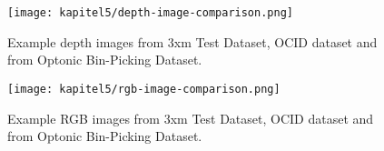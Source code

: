		\FloatBarrier
		\begin{figure}[h]
			\centering
			\texttt{[image: kapitel5/depth-image-comparison.png]}
			\caption[Example depth images from 3xm Test Dataset, OCID dataset and from Optonic Bin-Picking Dataset.]{Example depth images from 3xm Test Dataset, OCID dataset and from Optonic Bin-Picking Dataset.}
			\label{img:depth-image-comparison}
		\end{figure}
		
		\begin{figure}[h]
			\centering
			\texttt{[image: kapitel5/rgb-image-comparison.png]}
			\caption[Example RGB images from 3xm Test Dataset, OCID dataset and from Optonic Bin-Picking Dataset.]{Example RGB images from 3xm Test Dataset, OCID dataset and from Optonic Bin-Picking Dataset.}
			\label{img:rgb-image-comparison}
		\end{figure}
		\FloatBarrier
		
